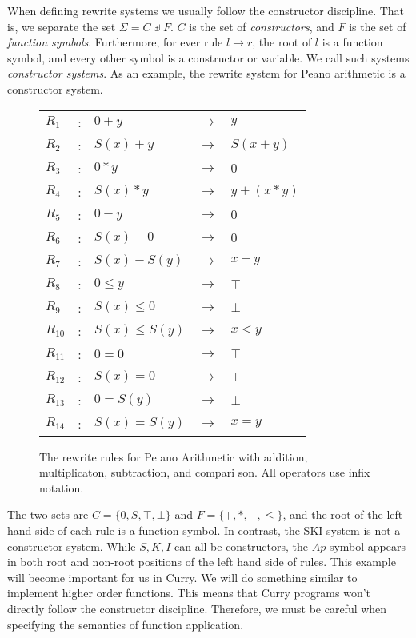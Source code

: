 \documentclass{article}
\theoremstyle{definition}
\begin{document}
When defining rewrite systems we usually follow the constructor discipline.
That is, we separate the set $\Sigma = C \uplus F$.
$C$ is the set of \textit{constructors},
and $F$ is the set of \textit{function symbols}.
Furthermore, for ever rule $l \to r$, the root of $l$ is a function symbol, 
and every other symbol is a constructor or variable.
We call such systems \textit{constructor systems}.
As an example, the rewrite system for Peano arithmetic is a constructor system.

\begin{figure}[h]
    \begin{tabular}{lclcl}
        $R_1$ &    : & $0    + y$      & $\to$ & $y$       \\
        $R_2$ &    : & $S(x) + y$      & $\to$ & $S(x+y)$  \\
        $R_3$ &    : & $0    * y$      & $\to$ & $0$       \\
        $R_4$ &    : & $S(x) * y$      & $\to$ & $y+(x*y)$ \\
        $R_5$ &    : & $0    - y$      & $\to$ & $0$       \\
        $R_6$ &    : & $S(x) - 0$      & $\to$ & $0$       \\
        $R_7$ &    : & $S(x) - S(y)$   & $\to$ & $x - y$   \\
        $R_8$ &    : & $0    \le y$    & $\to$ & $\top$    \\
        $R_9$ &    : & $S(x) \le 0$    & $\to$ & $\bot$    \\
        $R_{10}$ & : & $S(x) \le S(y)$ & $\to$ & $x < y$   \\
        $R_{11}$ & : & $0    = 0   $   & $\to$ & $\top$    \\
        $R_{12}$ & : & $S(x) = 0   $   & $\to$ & $\bot$    \\
        $R_{13}$ & : & $0    = S(y)$   & $\to$ & $\bot$    \\
        $R_{14}$ & : & $S(x) = S(y)$   & $\to$ & $x = y$   \\
    \end{tabular}
    \caption{The rewrite rules for Pe  ano Arithmetic with addition, multiplicaton,
             subtraction, and compari  son.  All operators use infix notation.}
    \label{fig:peano}
\end{figure}

The two sets are $C = \{0, S, \top, \bot\}$ and $F = \{+,*,-,\le\}$,
and the root of the left hand side of each rule is a function symbol.
In contrast, the SKI system is not a constructor system.
While $S,K,I$ can all be constructors, the $Ap$ symbol appears in both root
and non-root positions of the left hand side of rules.
This example will become important for us in Curry.
We will do something similar to implement higher order functions.
This means that Curry programs won't directly follow the constructor discipline.
Therefore, we must be careful when specifying the semantics of function application.
\end{document}
